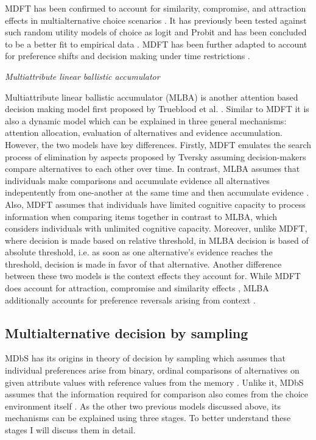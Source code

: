 \documentclass[a4paper,12pt]{article}
\newcommand{\citeyearonly}[1]{\citeyearpar{#1}}
\begin{document}
MDFT has been confirmed to account for similarity, compromise, and attraction effects in multialternative choice scenarios \citep{roe2001multialternative}. It has previously been tested against such random utility models of choice as logit and Probit and has been concluded to be a better fit to empirical data \citep{berkowitsch2014rigorously}. 
MDFT has been further adapted to account for preference shifts \citep{mohr2017attraction} and decision making under time restrictions \citep{diederich2003mdft}.

\textit{Multiattribute linear ballistic accumulator}

Multiattribute linear ballistic accumulator (MLBA) is another attention based decision making model first proposed by Trueblood et al. \citeyearonly{trueblood2014multiattribute}. Similar to MDFT it is also a dynamic model which can be explained in three general mechanisms: attention allocation, evaluation of alternatives and evidence accumulation. However, the two models have key differences. Firstly, MDFT emulates the search process of elimination by aspects proposed by Tversky \citeyearonly{tversky1972elimination} assuming decision-makers compare alternatives to each other over time. In contrast, MLBA assumes that individuals make comparisons and accumulate evidence all alternatives indepentently from one-another at the same time and then accumulate evidence \citep{trueblood15fragile}. Also, MDFT assumes that individuals have limited cognitive capacity to process information when comparing items together in contrast to MLBA, which considers individuals with unlimited cognitive capacity. Moreover, unlike MDFT, where decision is made based on relative threshold, in MLBA decision is based of absolute threshold, i.e. as soon as one alternative's evidence reaches the threshold, decision is made in favor of that alternative. Another difference between these two models is the context effects they account for. While MDFT does account for attraction, compromise and similarity effects \citep{hotaling2019quantitative}, MLBA additionally accounts for preference reversals arising from context \citep{trueblood15fragile}. 


\subsection{Multialternative decision by sampling}

MDbS has its origins in theory of decision by sampling which assumes that individual preferences arise from binary, ordinal comparisons of alternatives on given attribute values with reference values from the memory \citep{stewart2006decision}. Unlike it, MDbS assumes that the information required for comparison also comes from the choice environment itself \citep{noguchi2018multialternative}. As the other two previous models discussed above, its mechanisms can be explained using three stages. To better understand these stages I will discuss them in detail.
\end{document}
